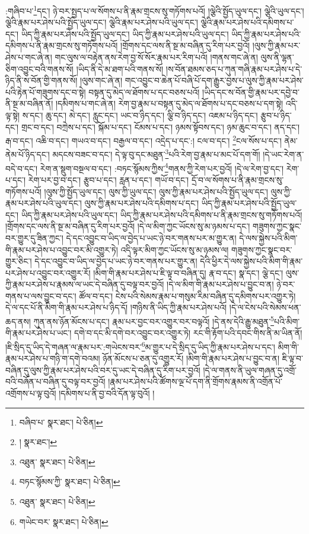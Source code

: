 :གཞིབ་པ་\footnote{བཞིབ་པ་  སྣར་ཐང་།  པེ་ཅིན། }དང་། ཉེ་བར་སྤྱད་པ་ལ་སོགས་པ་ནི་རྣམ་གྲངས་སུ་གཏོགས་པའོ། །ལྕེའི་སྤྱོད་ཡུལ་དང་། ལྕེའི་ཡུལ་དང་། ལྕེའི་རྣམ་པར་ཤེས་པའི་སྤྱོད་ཡུལ་དང་། ལྕེའི་རྣམ་པར་ཤེས་པའི་ཡུལ་དང་། ལྕེའི་རྣམ་པར་ཤེས་པའི་དམིགས་པ་དང་། ཡིད་ཀྱི་རྣམ་པར་ཤེས་པའི་སྤྱོད་ཡུལ་དང་། ཡིད་ཀྱི་རྣམ་པར་ཤེས་པའི་ཡུལ་དང་། ཡིད་ཀྱི་རྣམ་པར་ཤེས་པའི་དམིགས་པ་ནི་རྣམ་གྲངས་སུ་གཏོགས་པའོ། །གྲོགས་དང་ལས་ནི་སྔ་མ་བཞིན་དུ་རིག་པར་བྱའོ། །ལུས་ཀྱི་རྣམ་པར་ཤེས་པ་གང་ཞེ་ན། གང་ལུས་ལ་བརྟེན་ནས་རེག་བྱ་སོ་སོར་རྣམ་པར་རིག་པའོ། །གནས་གང་ཞེ་ན། ལུས་ནི་ལྷན་ཅིག་འབྱུང་བའི་གནས་སོ། །ཡིད་ནི་དེ་མ་ཐག་པའི་གནས་སོ། །ས་བོན་ཐམས་ཅད་པ་ཀུན་གཞི་རྣམ་པར་ཤེས་པ་དེ་ཉིད་ནི་ས་བོན་གྱི་གནས་སོ། །ལུས་གང་ཞེ་ན། གང་འབྱུང་བ་ཆེན་པོ་བཞི་པོ་དག་རྒྱུར་བྱས་པ་ལུས་ཀྱི་རྣམ་པར་ཤེས་པའི་རྟེན་པོ་གཟུགས་དང་བ་སྟེ། བསྟན་དུ་མེད་ལ་ཐོགས་པ་དང་བཅས་པའོ། །ཡིད་དང་ས་བོན་གྱི་རྣམ་པར་དབྱེ་བ་ནི་སྔ་མ་བཞིན་ནོ། །དམིགས་པ་གང་ཞེ་ན། རེག་བྱ་རྣམ་པ་བསྟན་དུ་མེད་ལ་ཐོགས་པ་དང་བཅས་པ་དག་སྟེ། འདི་ལྟ་སྟེ། ས་དང་། ཆུ་དང་། མེ་དང་། རླུང་དང་། ཡང་བ་ཉིད་དང་། ལྕི་བ་ཉིད་དང་། འཇམ་པ་ཉིད་དང་། རྩུབ་པ་ཉིད་དང་། གྲང་བ་དང་། བཀྲེས་པ་དང་། སྐོམ་པ་དང་། ངོམས་པ་དང་། ཉམས་སྟོབས་དང་། ཉམ་ཆུང་བ་དང་། ནད་དང་། རྒ་བ་དང་། འཆི་བ་དང་། གཡའ་བ་དང་། བརྒྱལ་བ་དང་། འདྲེད་པ་དང་:། ངལ་བ་དང་། \footnote{།    སྣར་ཐང་། }ངལ་སོས་པ་དང་། ནེམ་ནེམ་པོ་ཉིད་དང་། མདངས་བཟང་བ་དང་། དེ་ལྟ་བུ་དང་མཐུན་\footnote{འཐུན་  སྣར་ཐང་།  པེ་ཅིན། }པའི་རེག་བྱ་རྣམ་པ་མང་པོ་དག་གོ། །དེ་ཡང་རེག་ན་བདེ་བ་དང་། རེག་ན་སྡུག་བསྔལ་བ་དང་། :བཏང་སྙོམས་ཀྱིས་\footnote{བཏང་སྙོམས་ཀྱི་  སྣར་ཐང་།  པེ་ཅིན། }གནས་ཀྱི་རེག་པར་བྱའོ། །དེ་ལ་རེག་བྱ་དང་། རེག་པ་དང་། རེག་པར་བྱ་བ་དང་། རྩུབ་པ་དང་། རླན་པ་དང་། གཡོ་བ་དང་། དྲོ་བ་ལ་སོགས་པ་ནི་རྣམ་གྲངས་སུ་གཏོགས་པའོ། །ལུས་ཀྱི་སྤྱོད་ཡུལ་དང་། ལུས་ཀྱི་ཡུལ་དང་། ལུས་ཀྱི་རྣམ་པར་ཤེས་པའི་སྤྱོད་ཡུལ་དང་། ལུས་ཀྱི་རྣམ་པར་ཤེས་པའི་ཡུལ་དང་། ལུས་ཀྱི་རྣམ་པར་ཤེས་པའི་དམིགས་པ་དང་། ཡིད་ཀྱི་རྣམ་པར་ཤེས་པའི་སྤྱོད་ཡུལ་དང་། ཡིད་ཀྱི་རྣམ་པར་ཤེས་པའི་ཡུལ་དང་། ཡིད་ཀྱི་རྣམ་པར་ཤེས་པའི་དམིགས་པ་ནི་རྣམ་གྲངས་སུ་གཏོགས་པའོ། །གྲོགས་དང་ལས་ནི་སྔ་མ་བཞིན་དུ་རིག་པར་བྱའོ། །དེ་ལ་མིག་ཀྱང་ཡོངས་སུ་མ་ཉམས་པ་དང་། གཟུགས་ཀྱང་སྣང་བར་གྱུར་དུ་ཟིན་ཀྱང་། དེ་དང་འབྱུང་བ་ཡིད་ལ་བྱེད་པ་ཡང་ཉེ་བར་གནས་པར་མ་གྱུར་ན། དེ་ལས་སྐྱེས་པའི་མིག་གི་རྣམ་པར་ཤེས་པ་འབྱུང་བར་མི་འགྱུར་ཏེ། འདི་ལྟར་མིག་ཀྱང་ཡོངས་སུ་མ་ཉམས་ལ། གཟུགས་ཀྱང་སྣང་བར་གྱུར་ཅིང་། དེ་དང་འབྱུང་བ་ཡིད་ལ་བྱེད་པ་ཡང་ཉེ་བར་གནས་པར་གྱུར་ན། དེའི་ཕྱིར་དེ་ལས་སྐྱེས་པའི་མིག་གི་རྣམ་པར་ཤེས་པ་འབྱུང་བར་འགྱུར་རོ། །མིག་གི་རྣམ་པར་ཤེས་པ་ཇི་ལྟ་བ་བཞིན་དུ། རྣ་བ་དང་། སྣ་དང་། ལྕེ་དང་། ལུས་ཀྱི་རྣམ་པར་ཤེས་པ་རྣམས་ལ་ཡང་དེ་བཞིན་དུ་བལྟ་བར་བྱའོ། །དེ་ལ་མིག་གི་རྣམ་པར་ཤེས་པ་བྱུང་བ་ན། ཉེ་བར་གནས་པ་ལས་བྱུང་བ་དང་། ཚོལ་བ་དང་། ངེས་པའི་སེམས་རྣམ་པ་གསུམ་རིམ་བཞིན་དུ་དམིགས་པར་འགྱུར་ཏེ། དེ་ལ་དང་པོ་ནི་མིག་གི་རྣམ་པར་ཤེས་པ་ཉིད་དོ། །གཉིས་ནི་ཡིད་ཀྱི་རྣམ་པར་ཤེས་པའོ། །དེ་ལ་ངེས་པའི་སེམས་ཕན་ཆད་ནས། ཀུན་ནས་ཉོན་མོངས་པ་དང་། རྣམ་པར་བྱང་བར་འགྱུར་བར་བལྟའོ། །དེ་ནས་དེའི་རྒྱུ་མཐུན་\footnote{འཐུན་  སྣར་ཐང་།  པེ་ཅིན། }པའི་མིག་གི་རྣམ་པར་ཤེས་པ་ཡང་། དགེ་བ་དང་མི་དགེ་བར་འབྱུང་བར་འགྱུར་ཏེ། རང་གི་རྟོག་པའི་དབང་གིས་ནི་མ་ཡིན་ནོ། །ཇི་སྲིད་དུ་ཡིད་དེ་གཞན་ལ་རྣམ་པར་:གཡེངས་བར་\footnote{གཡེང་བར་  སྣར་ཐང་།  པེ་ཅིན། }མ་གྱུར་པ་དེ་སྲིད་དུ་ཡིད་ཀྱི་རྣམ་པར་ཤེས་པ་དང་། མིག་གི་རྣམ་པར་ཤེས་པ་གཉི་ག་དགེ་བའམ། ཉོན་མོངས་པ་ཅན་དུ་འགྱུར་རོ། །མིག་གི་རྣམ་པར་ཤེས་པ་བྱུང་བ་ན། ཇི་ལྟ་བ་བཞིན་དུ་ལུས་ཀྱི་རྣམ་པར་ཤེས་པའི་བར་དུ་ཡང་དེ་བཞིན་དུ་རིག་པར་བྱའོ། །དེ་ལ་གནས་ནི་ཡུལ་གཞན་དུ་འགྲོ་བའི་བཞོན་པ་བཞིན་དུ་བལྟ་བར་བྱའོ། །རྣམ་པར་ཤེས་པའི་ཚོགས་ལྔ་པོ་དག་ནི་གྲོགས་རྣམས་ནི་འགྲོན་པོ་འགྲོགས་པ་ལྟ་བུའོ། །དམིགས་པ་ནི་བྱ་བའི་དོན་ལྟ་བུའོ། །
